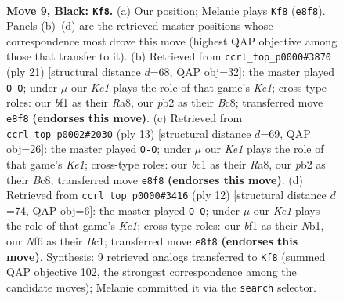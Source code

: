 \documentclass[11pt]{article}
\begin{document}
\begin{figure}[p]\centering
\begin{subfigure}{0.46\textwidth}\centering
\resizebox{\linewidth}{!}{%
\newchessgame
\chessboard[
  setfen={rnbqk1r1/pp2bppp/5n2/3p2N1/3P4/2N5/PP1K1PPP/R1BQ1B1R b q - 1 9},
  showmover=false,
  pgfstyle=straightmove, color=movearrow, markmove={e8-f8}
]}
\caption{}
\end{subfigure}\hfill
\begin{subfigure}{0.46\textwidth}\centering
\resizebox{\linewidth}{!}{%
\newchessgame
\chessboard[
  setfen={r1bqk2r/ppn1bppp/4pn2/4N3/2QP4/P1N5/1P2BPPP/R1B1K2R b KQkq - 4 11},
  showmover=false,
  pgfstyle=straightmove, color=movearrow, markmove={e8-g8}
]}
\caption{}
\end{subfigure}
\\[4pt]
\begin{subfigure}{0.46\textwidth}\centering
\resizebox{\linewidth}{!}{%
\newchessgame
\chessboard[
  setfen={rnbqk2r/ppp1bppp/5n2/3p4/3P4/2N1P3/PP1B1PPP/R2QKBNR b KQkq - 0 7},
  showmover=false,
  pgfstyle=straightmove, color=movearrow, markmove={e8-g8}
]}
\caption{}
\end{subfigure}\hfill
\begin{subfigure}{0.46\textwidth}\centering
\resizebox{\linewidth}{!}{%
\newchessgame
\chessboard[
  setfen={r1bqkb1r/ppp2ppp/2n5/3p4/3Pn3/3B1N2/PPP2PPP/RNBQK2R w KQkq - 2 7},
  showmover=false,
  pgfstyle=straightmove, color=movearrow, markmove={e1-g1}
]}
\caption{}
\end{subfigure}
\caption{\textbf{Move 9, Black: \texttt{Kf8}.} (a) Our position; Melanie plays \texttt{Kf8} (\texttt{e8f8}). Panels (b)--(d) are the retrieved master positions whose correspondence most drove this move (highest QAP objective among those that transfer to it). (b) Retrieved from \texttt{ccrl\_top\_p0000\#3870} (ply 21) [structural distance $d$=68, QAP obj=32]: the master played \texttt{O-O}; under $\mu$ our \emph{Ke1} plays the role of that game's \emph{Ke1}; cross-type roles: our \emph{b}f1 as their \emph{R}a8, our \emph{p}b2 as their \emph{B}c8; transferred move \texttt{e8f8} \textbf{(endorses this move)}. (c) Retrieved from \texttt{ccrl\_top\_p0002\#2030} (ply 13) [structural distance $d$=69, QAP obj=26]: the master played \texttt{O-O}; under $\mu$ our \emph{Ke1} plays the role of that game's \emph{Ke1}; cross-type roles: our \emph{b}c1 as their \emph{R}a8, our \emph{p}b2 as their \emph{B}c8; transferred move \texttt{e8f8} \textbf{(endorses this move)}. (d) Retrieved from \texttt{ccrl\_top\_p0000\#3416} (ply 12) [structural distance $d$=74, QAP obj=6]: the master played \texttt{O-O}; under $\mu$ our \emph{Ke1} plays the role of that game's \emph{Ke1}; cross-type roles: our \emph{b}f1 as their \emph{N}b1, our \emph{N}f6 as their \emph{B}c1; transferred move \texttt{e8f8} \textbf{(endorses this move)}. Synthesis: 9 retrieved analogs transferred to \texttt{Kf8} (summed QAP objective 102, the strongest correspondence among the candidate moves); Melanie committed it via the \texttt{search} selector.}
\label{fig:thought-m17}
\end{figure}
\end{document}
